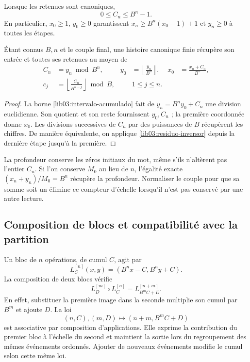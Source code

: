 Lorsque les retenues sont canoniques,
\begin{equation}
 0\leq C_n\leq B^n-1.
 \label{lib03:intervalo-acumulado}
\end{equation}
En particulier, \(x_0\geq1\), \(y_0\geq0\) garantissent
\(x_n\geq B^n(x_0-1)+1\) et \(y_n\geq0\) à toutes les étapes.

\begin{corollary}
\label{lib03:cor-palabra}
Étant connus \(B,n\) et le couple final, une histoire canonique finie
récupère son entrée et toutes ses retenues au moyen de
\begin{align}
 C_n&=y_n\bmod B^n,&
 y_0&=\left\lfloor\frac{y_n}{B^n}\right\rfloor,&
 x_0&=\frac{x_n+C_n}{B^n},
 \label{lib03:recuperacion-inicial}\\
 c_j&=\left\lfloor\frac{C_n}{B^{n-j}}\right\rfloor\bmod B,
 &&1\leq j\leq n.
 \label{lib03:recuperacion-digitos}
\end{align}
\end{corollary}

\begin{proof}
La borne \eqref{lib03:intervalo-acumulado} fait de \(y_n=B^ny_0+C_n\) une division euclidienne. Son quotient et son reste fournissent \(y_0,C_n\) ; la première coordonnée donne \(x_0\). Les divisions successives de \(C_n\) par des puissances de \(B\) récupèrent les chiffres. De manière équivalente, on applique \eqref{lib03:residuo-inversor} depuis la dernière étape jusqu'à la première.
\end{proof}

La profondeur conserve les zéros initiaux du mot, même s’ils
n’altèrent pas l’entier \(C_n\). Si l’on conserve \(M_0\) au lieu de
\(n\), l’égalité exacte \((x_n+y_n)/M_0=B^n\) récupère la
profondeur. Normaliser le couple pour que sa somme soit un élimine ce compteur
d’échelle lorsqu’il n’est pas conservé par une autre lecture.

\subsection{Composition de blocs et compatibilité avec la partition}
\label{lib03:composicion}

Un bloc de \(n\) opérations, de cumul \(C\), agit par
\begin{equation}
 L_C^{[n]}(x,y)=(B^nx-C,B^ny+C).
 \label{lib03:bloque}
\end{equation}
La composition de deux blocs vérifie
\begin{equation}
 L_D^{[m]}\circ L_C^{[n]}=L_{B^mC+D}^{[n+m]}.
 \label{lib03:ley-bloques}
\end{equation}
En effet, substituer la première image dans la seconde multiplie son cumul par \(B^m\) et ajoute \(D\). La loi
\[
 (n,C),(m,D)\longmapsto(n+m,B^mC+D)
\]
est associative par composition d’applications. Elle exprime la contribution
du premier bloc à l’échelle du second et maintient la sortie lors du
regroupement des mêmes événements ordonnés. Ajouter de nouveaux événements modifie
le cumul selon cette même loi.

